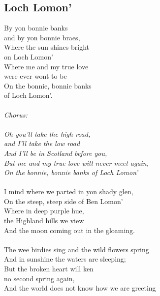 \documentclass[a5paper]{article}
\begin{document}
\newpage


\subsection{Loch Lomon'} %
\label{sub:loch_lomon}


By yon bonnie banks \\
and by yon bonnie braes,\\
Where the sun shines bright \\
on Loch Lomon'\\
Where me and my true love \\
were ever wont to be\\
On the bonnie, bonnie banks \\
of Loch Lomon'.\\
\\
\textit{Chorus:\\
\\
Oh you'll take the high road,\\
and I'll take the low road\\
And I'll be in Scotland before you,\\
But me and my true love will never meet again,\\
On the bonnie, bonnie banks of Loch Lomon'}\\
\\
I mind where we parted in yon shady glen,\\
On the steep, steep side of Ben Lomon'\\
Where in deep purple hue,\\
the Highland hills we view\\
And the moon coming out in the gloaming.\\
\\
The wee birdies sing and the wild flowers spring\\
And in sunshine the waters are sleeping;\\
But the broken heart will ken \\
no second spring again,\\
And the world does not know how we are greeting\\

\end{document}

